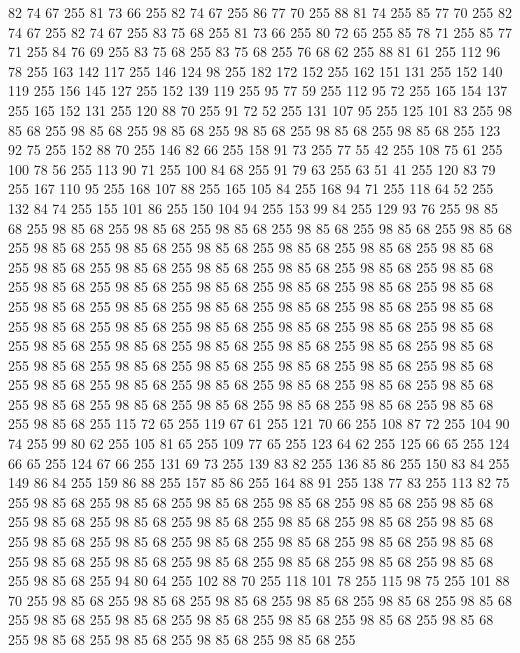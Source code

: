 82 74 67 255 81 73 66 255 82 74 67 255 86 77 70 255 88 81 74 255 85 77 70 255 82 74 67 255 82 74 67 255 83 75 68 255 81 73 66 255 80 72 65 255 85 78 71 255 85 77 71 255 84 76 69 255 83 75 68 255 83 75 68 255 76 68 62 255 88 81 61 255 112 96 78 255 163 142 117 255 146 124 98 255 182 172 152 255 162 151 131 255 152 140 119 255 156 145 127 255 152 139 119 255 95 77 59 255 112 95 72 255 165 154 137 255 165 152 131 255 120 88 70 255 91 72 52 255 131 107 95 255 125 101 83 255 98 85 68 255 98 85 68 255 98 85 68 255 98 85 68 255 98 85 68 255 98 85 68 255 123 92 75 255 152 88 70 255 146 82 66 255 158 91 73 255 77 55 42 255 108 75 61 255 100 78 56 255 113 90 71 255 100 84 68 255 91 79 63 255 63 51 41 255 120 83 79 255 167 110 95 255 168 107 88 255 165 105 84 255 168 94 71 255 118 64 52 255 132 84 74 255 155 101 86 255 150 104 94 255 153 99 84 255 129 93 76 255 98 85 68 255 98 85 68 255
98 85 68 255 98 85 68 255 98 85 68 255 98 85 68 255 98 85 68 255 98 85 68 255 98 85 68 255 98 85 68 255 98 85 68 255 98 85 68 255 98 85 68 255 98 85 68 255 98 85 68 255 98 85 68 255 98 85 68 255 98 85 68 255 98 85 68 255 98 85 68 255 98 85 68 255 98 85 68 255 98 85 68 255 98 85 68 255 98 85 68 255 98 85 68 255 98 85 68 255 98 85 68 255 98 85 68 255 98 85 68 255 98 85 68 255 98 85 68 255 98 85 68 255 98 85 68 255 98 85 68 255 98 85 68 255 98 85 68 255 98 85 68 255 98 85 68 255 98 85 68 255 98 85 68 255 98 85 68 255 98 85 68 255 98 85 68 255 98 85 68 255 98 85 68 255 98 85 68 255 98 85 68 255 98 85 68 255 98 85 68 255 98 85 68 255 98 85 68 255 98 85 68 255 98 85 68 255 98 85 68 255 98 85 68 255 98 85 68 255 98 85 68 255 98 85 68 255 98 85 68 255 98 85 68 255 98 85 68 255 115 72 65 255 119 67 61 255 121 70 66 255 108 87 72 255
104 90 74 255 99 80 62 255 105 81 65 255 109 77 65 255 123 64 62 255 125 66 65 255 124 66 65 255 124 67 66 255 131 69 73 255 139 83 82 255 136 85 86 255 150 83 84 255 149 86 84 255 159 86 88 255 157 85 86 255 164 88 91 255 138 77 83 255 113 82 75 255 98 85 68 255 98 85 68 255 98 85 68 255 98 85 68 255 98 85 68 255 98 85 68 255 98 85 68 255 98 85 68 255 98 85 68 255 98 85 68 255 98 85 68 255 98 85 68 255 98 85 68 255 98 85 68 255 98 85 68 255 98 85 68 255 98 85 68 255 98 85 68 255 98 85 68 255 98 85 68 255 98 85 68 255 98 85 68 255 98 85 68 255 98 85 68 255 98 85 68 255 94 80 64 255 102 88 70 255 118 101 78 255 115 98 75 255 101 88 70 255 98 85 68 255 98 85 68 255 98 85 68 255 98 85 68 255 98 85 68 255 98 85 68 255 98 85 68 255 98 85 68 255 98 85 68 255 98 85 68 255 98 85 68 255 98 85 68 255 98 85 68 255 98 85 68 255 98 85 68 255 98 85 68 255
